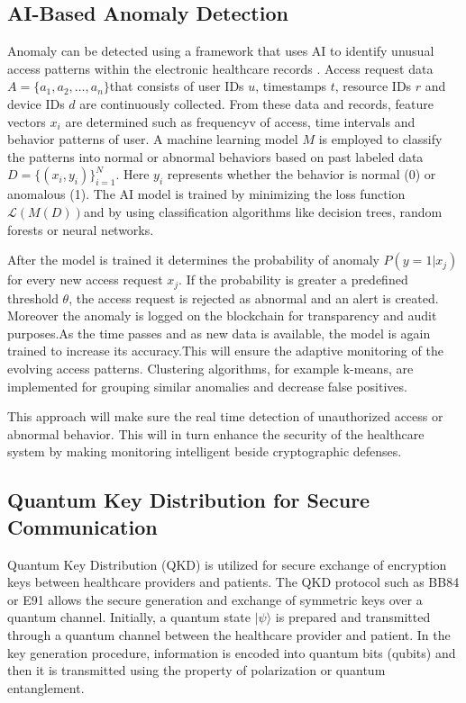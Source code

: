 \documentclass[pdflatex,sn-mathphys-num]{sn-jnl}
\theoremstyle{thmstyleone}%
\theoremstyle{thmstyletwo}%
\theoremstyle{thmstylethree}%
\begin{document}





\subsection{AI-Based Anomaly Detection}
Anomaly can be detected using a framework that uses AI to identify unusual access patterns within the electronic healthcare records \cite{bib19}. Access request data \( A = \{a_1, a_2, \dots, a_n\} \)that consists of user IDs \( u \), timestamps \( t \), resource IDs \( r \) and device IDs \( d \) are continuously collected. From these data and records, feature vectors \( x_i \) are determined such as frequencyv of access, time intervals and behavior patterns of user. A machine learning model \( M \) is employed to classify the patterns into normal or abnormal behaviors based on past labeled data \( D = \{(x_i, y_i)\}_{i=1}^N \). Here \( y_i \) represents whether the behavior is normal (0) or anomalous (1). The AI model is trained by minimizing the loss function \( \mathcal{L}(M(D)) \)and by using classification algorithms like decision trees, random forests or neural networks\cite{bib18}.

After the model is trained it determines the probability of anomaly \( P(y=1|x_j) \) for every new access request \( x_j \). If the probability is greater a predefined threshold \( \theta \), the access request is rejected as abnormal and an alert is created. Moreover the anomaly is logged on the blockchain for transparency and audit purposes.As the time passes and as new data is available, the model is again trained to increase its accuracy.This will ensure the adaptive monitoring of the evolving access patterns. Clustering algorithms, for example k-means, are implemented for grouping similar anomalies and decrease false positives\cite{bib20}.

This approach will make sure the real time detection of unauthorized access or abnormal behavior. This will in turn enhance the security of the healthcare system by making  monitoring intelligent beside cryptographic defenses.




\subsection{Quantum Key Distribution for Secure Communication}
Quantum Key Distribution (QKD) is utilized for secure exchange of encryption keys between healthcare providers and patients\cite{bib21}. The QKD protocol such as BB84 or E91 allows the secure generation and exchange of symmetric keys over a quantum channel. Initially, a quantum state \( |\psi\rangle \) is prepared and transmitted through a quantum channel between the healthcare provider and patient. In the key generation procedure, information is encoded into quantum bits (qubits) and then it is transmitted using the property of polarization or quantum entanglement.
\end{document}
